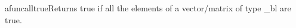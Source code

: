 afunc{alltrue}{Returns true if all the elements of a vector/matrix of type _bl are true.}
\\\cvsiplh
\\\pyjvsiph